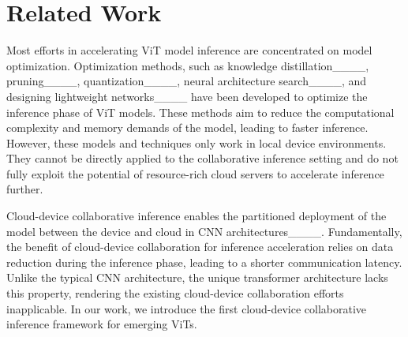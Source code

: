\section{Related Work}
\label{sec:Related Work}
Most efforts in accelerating ViT model inference are concentrated on model optimization. 
Optimization methods, such as knowledge distillation____, pruning____, quantization____, neural architecture 
search____, 
and designing lightweight networks____ have been developed to optimize the inference phase of ViT models. These methods aim to reduce the computational complexity and memory demands of the model, leading to faster inference. 
However, these models and techniques only work in local device environments. 
They cannot be directly applied to the collaborative inference setting and do not fully exploit the potential of resource-rich cloud servers to accelerate inference further. 

Cloud-device collaborative inference enables the partitioned deployment of the model between the device and cloud in CNN architectures____.
Fundamentally, the benefit of cloud-device collaboration for inference acceleration relies on data reduction during the inference phase, leading to a shorter communication latency.  Unlike the typical CNN architecture, the unique transformer architecture lacks this property, rendering the existing cloud-device collaboration efforts inapplicable. 
In our work, we introduce the first cloud-device collaborative inference framework for emerging ViTs.